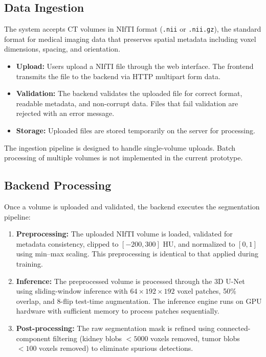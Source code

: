 \subsection{Data Ingestion}

The system accepts CT volumes in NIfTI format (\texttt{.nii} or \texttt{.nii.gz}), the standard format for medical imaging data that preserves spatial metadata including voxel dimensions, spacing, and orientation.

\begin{itemize}
    \item \textbf{Upload:} Users upload a NIfTI file through the web interface. The frontend transmits the file to the backend via HTTP multipart form data.
    \item \textbf{Validation:} The backend validates the uploaded file for correct format, readable metadata, and non-corrupt data. Files that fail validation are rejected with an error message. %
    \item \textbf{Storage:} Uploaded files are stored temporarily on the server for processing. %
\end{itemize}

The ingestion pipeline is designed to handle single-volume uploads. Batch processing of multiple volumes is not implemented in the current prototype.

\subsection{Backend Processing}

Once a volume is uploaded and validated, the backend executes the segmentation pipeline:

\begin{enumerate}
    \item \textbf{Preprocessing:} The uploaded NIfTI volume is loaded, validated for metadata consistency, clipped to $[-200, 300]$ HU, and normalized to $[0, 1]$ using min--max scaling. This preprocessing is identical to that applied during training.
    \item \textbf{Inference:} The preprocessed volume is processed through the 3D U-Net using sliding-window inference with $64 \times 192 \times 192$ voxel patches, 50\% overlap, and 8-flip test-time augmentation. The inference engine runs on GPU hardware with sufficient memory to process patches sequentially.
    \item \textbf{Post-processing:} The raw segmentation mask is refined using connected-component filtering (kidney blobs $< 5000$ voxels removed, tumor blobs $< 100$ voxels removed) to eliminate spurious detections.
\end{enumerate}

